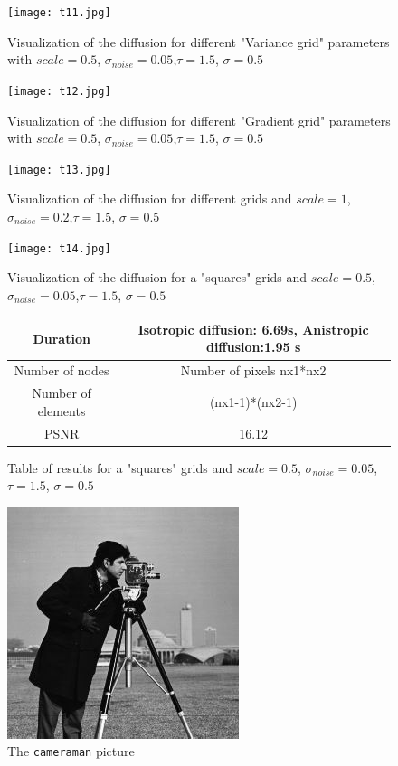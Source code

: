 \documentclass{report}
\begin{document}
\begin{figure}
	\centering
	\label{t11}
	\caption{Visualization of the diffusion for different "Variance grid" parameters with $scale=0.5$, $\sigma_{noise}=0.05$,$\tau=1.5$, $\sigma=0.5$ }
	\texttt{[image: t11.jpg]}
\end{figure}

\begin{figure}
	\centering
	\label{t12}
	\caption{Visualization of the diffusion for different "Gradient grid" parameters with $scale=0.5$, $\sigma_{noise}=0.05$,$\tau=1.5$, $\sigma=0.5$ }
	\texttt{[image: t12.jpg]}
\end{figure}



\begin{figure}[h!]
	\label{t13}
	\centering
	\caption{Visualization of the diffusion for different grids and $scale=1$, $\sigma_{noise}=0.2$,$\tau=1.5$, $\sigma=0.5$ }
	\texttt{[image: t13.jpg]}
\end{figure}

        \begin{figure}
        	\label{t14}
        	\centering
        	\caption{Visualization of the diffusion for a "squares" grids and $scale=0.5$, $\sigma_{noise}=0.05$,$\tau=1.5$, $\sigma=0.5$ }
        	\texttt{[image: t14.jpg]}
        \end{figure}
        
        
        
        \begin{figure}
        	\centering
        	\caption{Table of results for a "squares" grids and $scale=0.5$, $\sigma_{noise}=0.05$,$\tau=1.5$, $\sigma=0.5$ }
        	\label{T14}
        	\begin{tabular}{|c|c|}
        		\hline
        		Duration &  
        		Isotropic diffusion: 6.69s,
        		Anistropic diffusion:1.95 s   \\
        		\hline
        		Number of nodes & Number of pixels nx1*nx2 \\
        		\hline
        		Number of elements & (nx1-1)*(nx2-1)\\
        		\hline
        		PSNR & 16.12 \\
        		\hline
        	\end{tabular}
        \end{figure}

\begin{figure} \label{cameraman}
	\centering
	\includegraphics{cameraman.jpg}
	\caption{The \texttt{cameraman} picture}
\end{figure}


\end{document}
